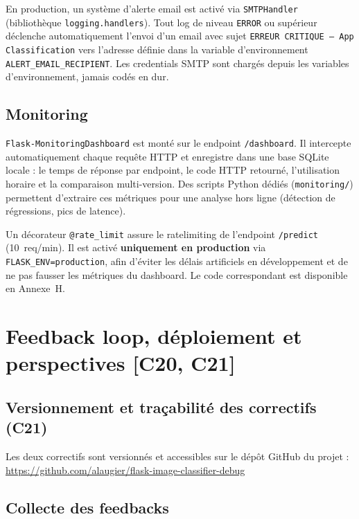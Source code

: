 \documentclass[french, a4paper, 12pt]{article}
\begin{document}
En production, un système d'alerte email est activé via \texttt{SMTPHandler}
(bibliothèque \texttt{logging.handlers}). Tout log de niveau \texttt{ERROR} ou
supérieur déclenche automatiquement l'envoi d'un email avec sujet
\og\texttt{ERREUR CRITIQUE --- App Classification}\fg{} vers l'adresse définie
dans la variable d'environnement \texttt{ALERT\_EMAIL\_RECIPIENT}. Les
credentials SMTP sont chargés depuis les variables d'environnement, jamais
codés en dur.

\subsection{Monitoring}

\texttt{Flask-MonitoringDashboard} est monté sur le endpoint \texttt{/dashboard}.
Il intercepte automatiquement chaque requête HTTP et enregistre dans une base
SQLite locale : le temps de réponse par endpoint, le code HTTP retourné,
l'utilisation horaire et la comparaison multi-version. Des scripts Python
dédiés (\texttt{monitoring/}) permettent d'extraire ces métriques pour une
analyse hors ligne (détection de régressions, pics de latence).

Un décorateur \texttt{@rate\_limit} assure le \gls{ratelimiting} de l'endpoint
\texttt{/predict} (10~req/min). Il est activé \textbf{uniquement en production}
via \texttt{FLASK\_ENV=production}, afin d'éviter les délais artificiels en
développement et de ne pas fausser les métriques du dashboard.
Le code correspondant est disponible en Annexe~H.

\section{Feedback loop, déploiement et perspectives \textnormal{\small\textcolor{RNCPred}{[C20, C21]}}}

\subsection{Versionnement et traçabilité des correctifs (C21)}

Les deux correctifs sont versionnés et accessibles sur le dépôt GitHub du projet :
\url{https://github.com/alaugier/flask-image-classifier-debug}

\subsection{Collecte des feedbacks}
\end{document}
